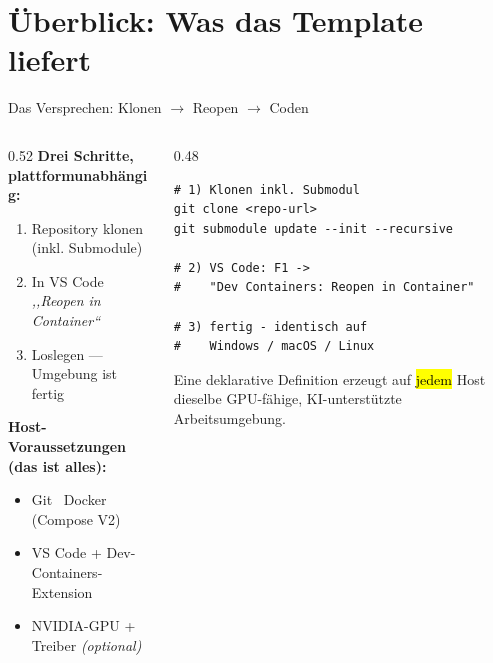 \documentclass[aspectratio=169,11pt]{beamer}
\begin{document}
\section{Überblick: Was das Template liefert}
\begin{frame}[fragile]{Das Versprechen: Klonen $\rightarrow$ Reopen $\rightarrow$ Coden}
  \begin{columns}[T]
    \begin{column}{0.52\textwidth}
      \textbf{Drei Schritte, plattformunabhängig:}
      \begin{enumerate}
        \item Repository klonen (inkl. Submodule)
        \item In VS Code \emph{,,Reopen in Container``}
        \item Loslegen --- Umgebung ist fertig
      \end{enumerate}
      \vspace{0.4em}
      \textbf{Host-Voraussetzungen (das ist alles):}
      \begin{itemize}
        \item Git \textperiodcentered\ Docker (Compose V2)
        \item VS Code + Dev-Containers-Extension
        \item NVIDIA-GPU + Treiber \emph{(optional)}
      \end{itemize}
    \end{column}
    \begin{column}{0.48\textwidth}
\begin{lstlisting}[language=myshell]
# 1) Klonen inkl. Submodul
git clone <repo-url>
git submodule update --init --recursive

# 2) VS Code: F1 ->
#    "Dev Containers: Reopen in Container"

# 3) fertig - identisch auf
#    Windows / macOS / Linux
\end{lstlisting}
      \begin{takeaway}
        Eine deklarative Definition erzeugt auf \hl{jedem} Host dieselbe
        GPU-fähige, KI-unterstützte Arbeitsumgebung.
      \end{takeaway}
    \end{column}
  \end{columns}
\end{frame}
\end{document}

